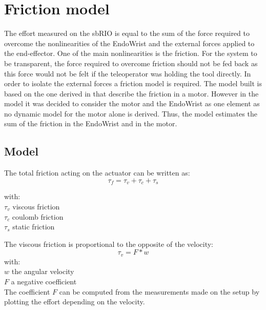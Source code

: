\section{Friction model}

The effort measured on the sbRIO is equal to the sum of the force required to overcome the nonlinearities of the EndoWrist and the external forces applied to the end-effector. One of the main nonlinearities is the friction. For the system to be transparent, the force required to overcome friction should not be fed back as this force would not be felt if the teleoperator was holding the tool directly. In order to isolate the external forces a friction model is required. The model built is based on the one derived in \cite{force_reflection} that describe the friction in a motor. However in the model it was decided to consider the motor and the EndoWrist as one element as no dynamic model for the motor alone is derived. Thus, the model estimates the sum of the friction in the EndoWrist and in the motor.

\subsection{Model}
The total friction acting on the actuator can be written as:
\vspace{9pt}
\begin{equation}
\tau_f = \tau_v + \tau_c + \tau_s
\label{eq:total_friction}
\end{equation} 

with:\\
\hspace*{8mm} $\tau_v$ viscous friction\\
\hspace*{8mm} $\tau_c$ coulomb friction\\
\hspace*{8mm} $\tau_s$ static friction    


The viscous friction is proportional to the opposite of the velocity:
\begin{equation}
\tau_v = F * w
\label{eq:viscous_friction}
\end{equation}
with:\\
\hspace*{8mm}$w$ the angular velocity\\
\hspace*{8mm}$F$ a negative coefficient\\

The coefficient $F$ can be computed from the measurements made on the setup by plotting the effort depending on the velocity.

